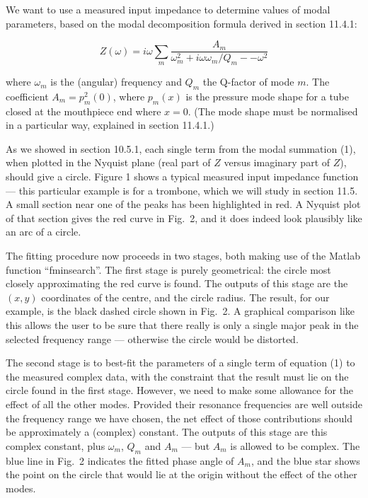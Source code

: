   We want to use a measured input impedance to determine values of modal 
  parameters, based on the modal decomposition formula derived in section 
  11.4.1: 

  $$Z(\omega) = i \omega \sum_m{\dfrac{A_m}{\omega_m^2+ i \omega \omega_m/Q_m 
  -- \omega^2}} \tag{1}$$ 

  where $\omega_m$ is the (angular) frequency and $Q_m$ the Q-factor of mode 
  $m$. The coefficient $A_m = p_m^2(0)$, where $p_m(x)$ is the pressure mode 
  shape for a tube closed at the mouthpiece end where $x=0$. (The mode shape 
  must be normalised in a particular way, explained in section 11.4.1.) 

  As we showed in section 10.5.1, each single term from the modal summation 
  (1), when plotted in the Nyquist plane (real part of $Z$ versus imaginary 
  part of $Z$), should give a circle. Figure 1 shows a typical measured input 
  impedance function — this particular example is for a trombone, which we will 
  study in section 11.5. A small section near one of the peaks has been 
  highlighted in red. A Nyquist plot of that section gives the red curve in 
  Fig.\ 2, and it does indeed look plausibly like an arc of a circle. 

  The fitting procedure now proceeds in two stages, both making use of the 
  Matlab function “fminsearch”. The first stage is purely geometrical: the 
  circle most closely approximating the red curve is found. The outputs of this 
  stage are the $(x,y)$ coordinates of the centre, and the circle radius. The 
  result, for our example, is the black dashed circle shown in Fig.\ 2. A 
  graphical comparison like this allows the user to be sure that there really 
  is only a single major peak in the selected frequency range — otherwise the 
  circle would be distorted. 

  The second stage is to best-fit the parameters of a single term of equation 
  (1) to the measured complex data, with the constraint that the result must 
  lie on the circle found in the first stage. However, we need to make some 
  allowance for the effect of all the other modes. Provided their resonance 
  frequencies are well outside the frequency range we have chosen, the net 
  effect of those contributions should be approximately a (complex) constant. 
  The outputs of this stage are this complex constant, plus $\omega_m$, $Q_m$ 
  and $A_m$ — but $A_m$ is allowed to be complex. The blue line in Fig.\ 2 
  indicates the fitted phase angle of $A_m$, and the blue star shows the point 
  on the circle that would lie at the origin without the effect of the other 
  modes. 

